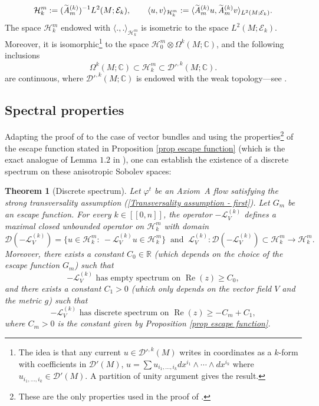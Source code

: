 \documentclass[JEP,XML,SOM,Unicode,NoEqCountersInSection,NoFloatCountersInSection,published]{cedram}
\newcommand{\lcr}{[\![}
\newcommand{\rcr}{]\!]}
\theoremstyle{definition}
\theoremstyle{plain}
\newtheorem{thm}{Theorem}
\newcommand{\A}{\emph{A}}
\newcommand{\C}{\mathbb{C}}
\newcommand{\D}{\mathcal{D}}
\newcommand{\Ecal}{\mathcal{E}}
\newcommand{\Hil}{\mathcal{H}}
\newcommand{\Lie}{\mathcal{L}}
\newcommand{\R}{\mathbb{R}}
\newcommand{\w}[1]{\langle {#1} \rangle}
\DeclareMathOperator{\re}{Re}
\begin{document}
\[
\Hil_k^{m}:= (\widetilde{\A}{}_m^{(k)})^{-1} L^2 (M; \Ecal_k), \qquad \w{u,v}_{\Hil_k^m}:= \w{\widetilde{\A}{}_m^{(k)} u, \widetilde{\A}{}_m^{(k)} v}_{L^2 (M;\Ecal_k)}.
\]
The space $\Hil_k^m$ endowed with $\w{.,.}_{\Hil_k^m}$ is isometric to the space $L^2 (M; \Ecal_k)$. Moreover, it is isomorphic\footnote{The idea is that any current $u \in \D'^{,k}(M)$ writes in coordinates as a $k$-form with coefficients in $\D'(M)$, \ie $u = \sum u_{i_1,\dots, i_k} dx^{i_1} \wedge \cdots \wedge dx^{i_k}$ where $u_{i_1,\dots, i_k} \in \D' (M)$. A partition of unity argument gives the result.} to the space $\Hil_0^m \otimes \Omega^k (M; \C)$, and the following inclusions
\[
\Omega^k (M; \C) \subset \Hil_k^m \subset \D'^{,k} (M ;\C).
\]
are continuous, where $\D'^{,k} (M; \C)$ is endowed with the weak topology---see \cite{schwartz}.

\subsection{Spectral properties}

Adapting the proof of \cite[Th.\,1.4]{FS} to the case of vector bundles and using the properties\footnote{These are the only properties used in the proof of \cite{FS}.} of the escape function stated in Proposition \ref{prop escape function} (which is the exact analogue of Lemma $1.2$ in \cite{FS}), one can establish the existence of a discrete spectrum on these anisotropic Sobolev spaces:

\begin{thm}[Discrete spectrum]\label{thm: discrete sprectrum} Let $\varphi^t$ be an Axiom~A flow satisfying the strong transversality assumption (\ref{Transversality assumption - first}). Let $G_m$ be an escape function. For every $k\in\lcr0,n\rcr$, the operator $-\Lie_V^{(k)}$ defines a maximal closed unbounded operator on $\Hil_k^m$ with domain
\[
\D (-\Lie_V^{(k)}) = \{u \in \Hil_k^m: \: -\Lie_V^{(k)} u \in \Hil_k^m \} \: \text{ and } \: \Lie_V^{(k)}: \D (-\Lie_V^{(k)}) \subset \Hil_k^m \to \Hil_k^m.
\]
Moreover, there exists a constant $C_0 \in \R$ (which depends on the choice of the escape function $G_m$) such that
\[
-\Lie_V^{(k)} \text{ has empty spectrum on } \re (z) \geq C_0,
\]
and there exists a constant $C_1 > 0$ (which only depends on the vector field $V$ and the metric $g$) such that
\[
-\Lie_V^{(k)} \text{ has discrete spectrum on } \re (z) \geq -C_m + C_1,
\]
where $C_m>0$ is the constant given by Proposition \ref{prop escape function}.
\end{thm}
\end{document}
